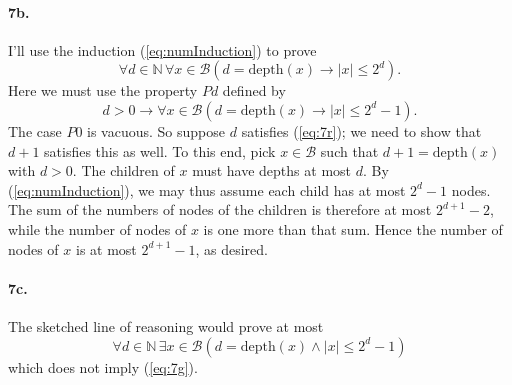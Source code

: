 \documentclass[
]{article}
\begin{document}
\paragraph{7b.} I'll use the induction (\ref{eq:numInduction}) to prove
\begin{equation}
  \label{eq:7g}
  \forall d\in \mathbb N\, \forall x\in \mathcal B(d=\text{depth}(x)\to |x|\leq 2^d).
\end{equation}
Here we must use the property $Pd$ defined by
\begin{equation}
  \label{eq:7r}
  d>0 \to \forall x\in \mathcal B(d=\text{depth}(x) \to |x|\leq 2^{d}-1).
\end{equation}
The case $P0$ is vacuous.  So suppose $d$ satisfies (\ref{eq:7r}); we need to show that $d+1$ satisfies this as well.  To this end, pick $x\in \mathcal B$ such that $d+1=\text{depth}(x)$ with $d>0$.  The children of $x$ must have depths at most $d$.  By (\ref{eq:numInduction}), we may thus assume each child has at most $2^d-1$ nodes. The sum of the numbers of nodes of the children is therefore at most $2^{d+1} - 2$, while the number of nodes of $x$ is one more than that sum. Hence the number of nodes of $x$ is at most $2^{d+1} - 1$, as desired.

\paragraph{7c.} The sketched line of reasoning would prove at most 
\begin{equation*}
  \forall d\in \mathbb N\, \exists x\in \mathcal B(d=\text{depth}(x)\land |x|\leq 2^d - 1)
\end{equation*}
which does not imply (\ref{eq:7g}).
\end{document}

